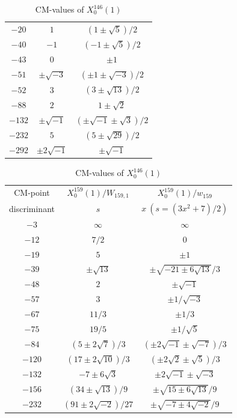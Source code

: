 \documentclass{amsart}
\theoremstyle{definition}
\begin{document}
\begin{appendices}
\begin{table}
\begin{tabular}{|c|c|c|}
${-20}$ & $1$ & $(1\pm\sqrt{5})/{2}$\\ 
${-40}$ & $-1$ & $(-1\pm\sqrt{5})/{2}$   \\ 
${-43}$ & $0$ & $\pm 1$   \\ 
${-51}$ & $\pm \sqrt{-3}$ & $(\pm 1\pm\sqrt{-3})/{2}$ \\ 
${-52}$ & $3$ & $(3\pm \sqrt{13})/{2}$  \\ 

${-88}$ & $2$ & $1\pm\sqrt{2}$  \\ 

${-132}$ & $\pm \sqrt{-1}$ & $(\pm\sqrt{-1}\pm\sqrt{3})/{2}$   \\ 

${-232}$ & $5$ & $(5\pm \sqrt{29})/{2}$  \\ 
${-292}$ & $\pm 2\sqrt{-1}$ & $\pm \sqrt{-1}$   \\ \hline
\end{tabular}%
\bigskip
\caption{CM-values of $X^{146}_0(1)$}

\renewcommand{\arraystretch}{1.5}
\tabcolsep=10pt                         
\begin{tabular}{|c|c|c|}
\hline
CM-point& ${X_{0}^{159}(1)/W_{159,1}}$ & ${X_{0}^{159}(1)/w_{159}}$  \\ 
discriminant & $s$ & $x\ (s=(3x^2+7)/{2})$   \\ \hline
${-3}$ & $\infty $ & $\infty $  \\ 

${-12}$ & ${7}/{2}$ & $0$ \\
${-19}$ & $5$ & $\pm1$   \\ 
${-39}$ & $\pm\sqrt{13}$ & ${\pm\sqrt{-21\pm6\sqrt{13}}}/{3}$  \\ 
${-48}$ & $2$ & $\pm \sqrt{-1}$   \\ 
${-57}$ & $3$ & $\pm1/\sqrt{-3}$  \\ 
${-67}$ & ${11}/{3}$ & $\pm{1}/{3}$ \\ 
${-75}$ & ${19}/{5}$ & $\pm1/\sqrt{5}$   \\ 
${-84}$ & $(5\pm2\sqrt{7})/{3}$ & $(\pm 2\sqrt{-1}\pm\sqrt{-7})/{3}$   \\ 
${-120}$ & $(17\pm2\sqrt{10})/{3}$ & $(\pm2\sqrt{2}\pm\sqrt{5})/{3}$  \\ 
${-132}$ & $-7\pm6\sqrt{3}$ & $\pm2\sqrt{-1}\pm\sqrt{-3}$   \\ 
${-156}$ & $(34\pm\sqrt{13})/{9}$ & $\pm\sqrt{15\pm6\sqrt{13}}/{9} $  \\ 
${-232}$ & $(91\pm2\sqrt{-2})/{27}$ & $\pm\sqrt{-7\pm4\sqrt{-2}}/{9} $   \\ 





\end{tabular}
\end{table}
\end{appendices}
\end{document}
